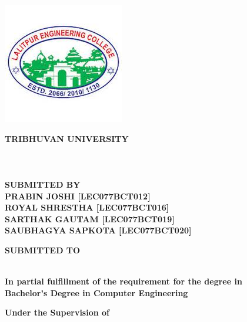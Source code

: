 \thispagestyle{empty}
\begin{center}
\begin{spacing}{1.6}

\includegraphics[scale=0.75]{img/Graphics/LOGO.jpeg}

\textbf{
\large{TRIBHUVAN UNIVERSITY}\\
\MakeUppercase{\large{\theinstitute}}\\
\MakeUppercase{\large{\thecampus}}}\\
\vspace{0.5cm}
\textbf{\MakeUppercase{\thetitle}\\
\vspace{0.5cm} 
SUBMITTED BY \\ 
\MakeUppercase{
Prabin joshi [lec077bct012]\\
Royal shrestha [lec077bct016]\\
Sarthak gautam [lec077bct019]\\
Saubhagya sapkota [lec077bct020]\\
}}
\vspace{0.5cm}
\par
\textbf{SUBMITTED TO}\\
\textbf{\MakeUppercase{\thedepartment}}\\
\textbf{\MakeUppercase{\thedepartmentAddress}}
\vspace{0.5cm}

\textbf{In partial fulfillment of the requirement for the degree in\\ Bachelor's Degree in Computer Engineering}


\textbf{Under the Supervision of}\\
\textbf{\thesupervisor}\\
\vspace{0.5cm}
\textbf{\MakeUppercase{\thedate}}


\end{spacing}
\end{center}

\clearpage